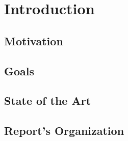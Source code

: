 
\section{Introduction}

\subsection{Motivation}

\subsection{Goals}

\subsection{State of the Art}



\subsection{Report's Organization}